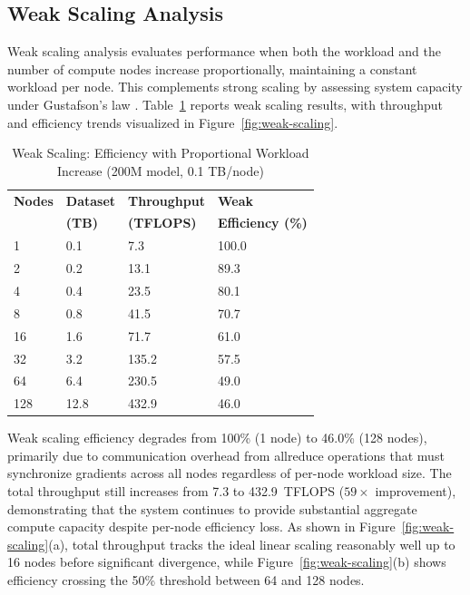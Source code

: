 \documentclass{llncs}
\begin{document}
\subsection{Weak Scaling Analysis}

Weak scaling analysis evaluates performance when both the workload and the number of compute nodes increase proportionally, maintaining a constant workload per node. This complements strong scaling by assessing system capacity under Gustafson's law \cite{Gustafson1988}. Table~\ref{tab:weak-scaling} reports weak scaling results, with throughput and efficiency trends visualized in Figure~\ref{fig:weak-scaling}.

\begin{table}[t]
\centering
\caption{Weak Scaling: Efficiency with Proportional Workload Increase (200M model, 0.1 TB/node)}
\label{tab:weak-scaling}
\begin{tabular*}{\columnwidth}{@{\extracolsep{\fill}} llll @{}}
\toprule
\textbf{Nodes} & \textbf{Dataset} & \textbf{Throughput} & \textbf{Weak} \\
 & \textbf{(TB)} & \textbf{(TFLOPS)} & \textbf{Efficiency (\%)} \\
\midrule
1 & 0.1 & 7.3 & 100.0 \\
2 & 0.2 & 13.1 & 89.3 \\
4 & 0.4 & 23.5 & 80.1 \\
8 & 0.8 & 41.5 & 70.7 \\
16 & 1.6 & 71.7 & 61.0 \\
32 & 3.2 & 135.2 & 57.5 \\
64 & 6.4 & 230.5 & 49.0 \\
128 & 12.8 & 432.9 & 46.0 \\
\bottomrule
\end{tabular*}
\end{table}

Weak scaling efficiency degrades from 100\% (1 node) to 46.0\% (128 nodes), primarily due to communication overhead from allreduce operations that must synchronize gradients across all nodes regardless of per-node workload size. The total throughput still increases from 7.3 to 432.9~TFLOPS ($59\times$ improvement), demonstrating that the system continues to provide substantial aggregate compute capacity despite per-node efficiency loss. As shown in Figure~\ref{fig:weak-scaling}(a), total throughput tracks the ideal linear scaling reasonably well up to 16 nodes before significant divergence, while Figure~\ref{fig:weak-scaling}(b) shows efficiency crossing the 50\% threshold between 64 and 128 nodes.
\end{document}
